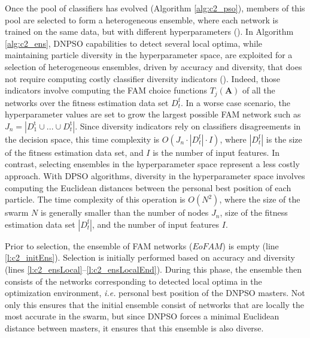 Once the pool of classifiers has evolved (Algorithm \ref{alg:c2_pso}), members of this pool are selected to form a heterogeneous ensemble, where each network is trained on the same data, but with different hyperparameters (\cite{valentini03}).
In Algorithm \ref{alg:c2_ens}, DNPSO capabilities to detect several local optima, while maintaining particle diversity in the hyperparameter space, are exploited for a selection of heterogeneous ensembles, driven by accuracy and diversity, that does not require computing costly classifier diversity indicators (\cite{canuto07, hadjitodorov06, kapp07, oliveira09, sirlantzis08, ulas09}).
Indeed, those indicators involve computing the FAM choice functions $T_j(\textbf{A})$ of all the networks over the fitness estimation data set $D_t^\text{f}$. 
In a worse case scenario, the hyperparameter values are set to grow the largest possible FAM network such as $J_n = |D_1^\text{t}\cup ...\cup D_t^\text{t}|$.
Since diversity indicators rely on classifiers disagreements in the decision space, this time complexity is $O(J_n \cdot |D_t^\text{f}| \cdot I)$, where $|D_t^\text{f}|$ is the size of the fitness estimation data set, and $I$ is the number of input features.
In contrast, selecting ensembles in the hyperparameter space represent a less costly approach.
With DPSO algorithms, diversity in the hyperparameter space involves computing the Euclidean distances between the personal best position of each particle.
The time complexity of this operation is $O(N^2)$, where the size of the swarm $N$ is generally smaller than the number of nodes $J_n$, size of the fitness estimation data set $|D_t^\text{f}|$, and the number of input features $I$. 

Prior to selection, the ensemble of FAM networks ($\textit{EoFAM}$) is empty (line \ref{l:c2_initEns}).
Selection is initially performed based on accuracy and diversity (lines \ref{l:c2_ensLocal}--\ref{l:c2_ensLocalEnd}).
During this phase, the ensemble then consists of the networks corresponding to detected local optima in the optimization environment, \emph{i.e.} personal best position of the DNPSO masters.
Not only this ensures that the initial ensemble consist of networks that are locally the most accurate in the swarm, but since DNPSO forces a minimal Euclidean distance between masters, it ensures that this ensemble is also diverse.

